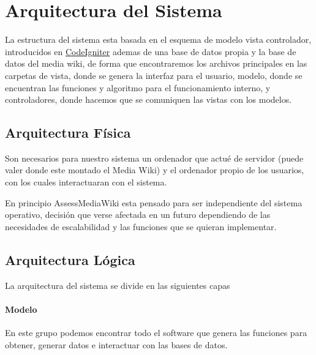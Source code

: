 

\section{Arquitectura del Sistema}
La estructura del sistema esta basada en el esquema de modelo vista controlador, introducidos en \href{http://www.codeigniter.com/}{CodeIgniter} ademas de una base de datos propia y la base de datos del media wiki, de forma que encontraremos los archivos principales en las carpetas de vista, donde se genera la interfaz para el usuario, modelo, donde se encuentran las funciones y algoritmo para el funcionamiento interno, y controladores, donde hacemos que se comuniquen las vistas con los modelos.

\subsection{Arquitectura Física}
Son necesarios para nuestro sistema un ordenador que actué de servidor (puede valer donde este montado el Media Wiki) y el ordenador propio de los usuarios, con los cuales interactuaran con el sistema.

En principio AssessMediaWiki esta pensado para ser independiente del sistema operativo, decisión que verse afectada en un futuro dependiendo de las necesidades de escalabilidad y las funciones que se quieran implementar.

\subsection{Arquitectura Lógica}
La arquitectura del sistema se divide en las siguientes capas

\paragraph*{Modelo}
En este grupo podemos encontrar todo el software que genera las funciones para obtener, generar datos e interactuar con las bases de datos.

